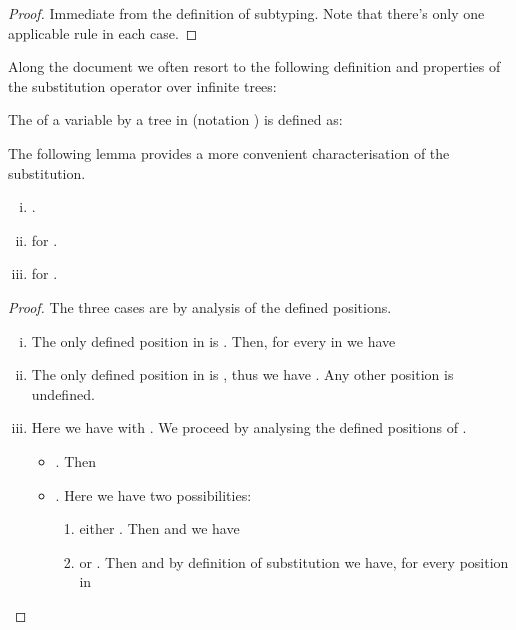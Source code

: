 \begin{proof}
Immediate from the definition of subtyping. Note that there's only one
applicable rule in each case.
\end{proof}


Along the document we often resort to the following definition and properties
of the substitution operator over infinite trees:

\begin{definition}
\label{def:treeSubstitution}
The  of a variable  by a tree  in  (notation
) is defined as: 
\end{definition}



The following lemma provides a more convenient characterisation of the
substitution.

\begin{lemma}
\label{lem:treeSubstitution}
\begin{enumerate}[(i)]
  \item .
  \item  for .
  \item  for .
\end{enumerate}
\end{lemma}

\begin{proof}
The three cases are by analysis of the defined positions.
\begin{enumerate}[(i)]
  \item The only defined position in  is . Then, for every 
  in  we have 
  
  \item The only defined position in  is , thus we have
  . Any other position is
  undefined.
  
  \item Here we have  with . We proceed by analysing the defined positions of
  .
  \begin{itemize}
    \item . Then
    
    \item . Here we have two possibilities:
    \begin{enumerate}
      \item either . Then  and we have 
      \item or . Then  and by definition of
      substitution we have, for every position  in  
    \end{enumerate}
  \end{itemize}
\end{enumerate}
\end{proof}



